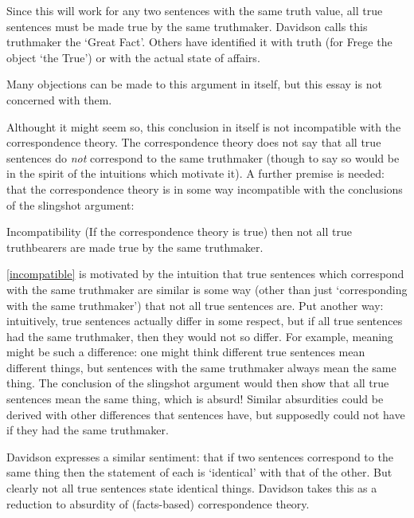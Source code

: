 Since this will work for any two sentences with the same truth value, all true sentences must be made true by the same truthmaker.
Davidson calls this truthmaker the `Great Fact'.
\parencite[753]{Davidson_1969}
Others have identified it with truth (for Frege the object `the True'\parencite[216]{Frege_1948}) or with the actual state of affairs. 

Many objections can be made to this argument in itself, but this essay is not concerned with them.

Althought it might seem so, this conclusion in itself is not incompatible with the correspondence theory.
The correspondence theory does not say that all true sentences do \emph{not} correspond to the same truthmaker (though to say so would be in the spirit of the intuitions which motivate it).
A further premise is needed: that the correspondence theory is in some way incompatible with the conclusions of the slingshot argument:

	\begin{principle}{Incompatibility} \label{incompatible}
	(If the correspondence theory is true) then not all true truthbearers are made true by the same truthmaker.
	\end{principle}

\ref{incompatible} is motivated by the intuition that true sentences which correspond with the same truthmaker are similar is some way (other than just `corresponding with the same truthmaker') that not all true sentences are.
Put another way: intuitively, true sentences actually differ in some respect, but if all true sentences had the same truthmaker, then they would not so differ.
For example, meaning might be such a difference: one might think different true sentences mean different things, but sentences with the same truthmaker always mean the same thing.
The conclusion of the slingshot argument would then show that all true sentences mean the same thing, which is absurd!
Similar absurdities could be derived with other differences that sentences have, but supposedly could not have if they had the same truthmaker.

Davidson expresses a similar sentiment: that if two sentences correspond to the same thing then the statement of each is `identical' with that of the other.
But clearly not all true sentences state identical things.
Davidson takes this as a reduction to absurdity of (facts-based) correspondence theory. %
\parencite[750]{Davidson_1969}

